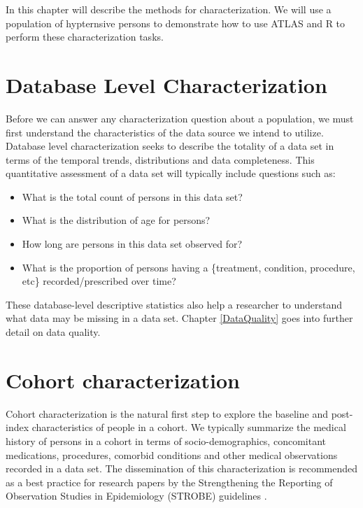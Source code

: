 \documentclass[11pt]{book}
\providecommand{\tightlist}{%
  \setlength{\itemsep}{0pt}\setlength{\parskip}{0pt}}
\theoremstyle{definition}
\theoremstyle{definition}
\theoremstyle{definition}
\theoremstyle{remark}
\begin{document}
In this chapter will describe the methods for characterization. We will use a population of hypternsive persons to demonstrate how to use ATLAS and R to perform these characterization tasks.

\hypertarget{database-level-characterization}{%
\section{Database Level Characterization}\label{database-level-characterization}}

Before we can answer any characterization question about a population, we must first understand the characteristics of the data source we intend to utilize. Database level characterization seeks to describe the totality of a data set in terms of the temporal trends, distributions and data completeness. This quantitative assessment of a data set will typically include questions such as:

\begin{itemize}
\tightlist
\item
  What is the total count of persons in this data set?
\item
  What is the distribution of age for persons?
\item
  How long are persons in this data set observed for?
\item
  What is the proportion of persons having a \{treatment, condition, procedure, etc\} recorded/prescribed over time?
\end{itemize}

These database-level descriptive statistics also help a researcher to understand what data may be missing in a data set. Chapter \ref{DataQuality} goes into further detail on data quality.

\hypertarget{cohort-characterization}{%
\section{Cohort characterization}\label{cohort-characterization}}

Cohort characterization is the natural first step to explore the baseline and post-index characteristics of people in a cohort. We typically summarize the medical history of persons in a cohort in terms of socio-demographics, concomitant medications, procedures, comorbid conditions and other medical observations recorded in a data set. The dissemination of this characterization is recommended as a best practice for research papers by the Strengthening the Reporting of Observation Studies in Epidemiology (STROBE) guidelines \citep{VONELM2008344}.
\end{document}
